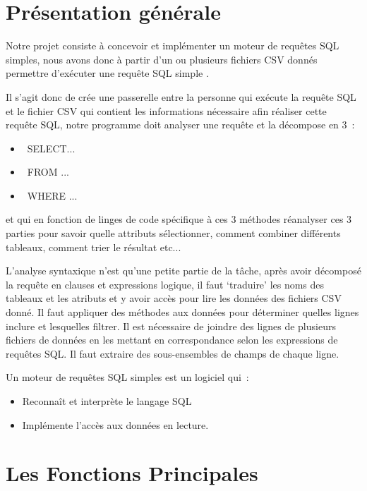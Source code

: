 \documentclass[oneside,13pt,a4paper]{report}
\begin{document}
    \section{Présentation générale}

        Notre projet consiste à concevoir et implémenter un moteur de requêtes SQL simples, 
        nous avons donc à partir d’un ou plusieurs fichiers CSV donnés permettre d’exécuter une requête SQL simple .

        Il s’agit donc de crée une passerelle entre la personne qui exécute la requête SQL et le fichier CSV qui contient les informations nécessaire afin réaliser cette requête SQL, 
        notre programme doit analyser une requête et la décompose en 3 : 
        \begin{itemize}
            \item SELECT...
            \item FROM ...
            \item WHERE ...
        \end{itemize}
        et qui en fonction de linges de code spécifique à ces 3 méthodes réanalyser ces 3 parties pour savoir quelle attributs sélectionner, 
        comment combiner différents tableaux, comment trier le résultat etc... 

        L’analyse syntaxique n’est qu’une petite partie de la tâche, 
        après avoir décomposé la requête en clauses et expressions logique, 
        il faut ‘traduire’ les noms des tableaux et les atributs et y avoir accès pour lire les données des fichiers CSV donné. 
        Il faut appliquer des méthodes aux données pour déterminer quelles lignes inclure et lesquelles filtrer. 
        Il est nécessaire de joindre des lignes de plusieurs fichiers de données en les mettant en correspondance selon les expressions de requêtes SQL. 
        Il faut extraire des sous-ensembles de champs de chaque ligne.
        
        Un moteur de requêtes SQL simples est un logiciel qui :
        \begin{itemize}
            \item Reconnaît et interprète le langage SQL
            \item Implémente l’accès aux données en lecture.
        \end{itemize}

    \section{Les Fonctions Principales}
\end{document}
